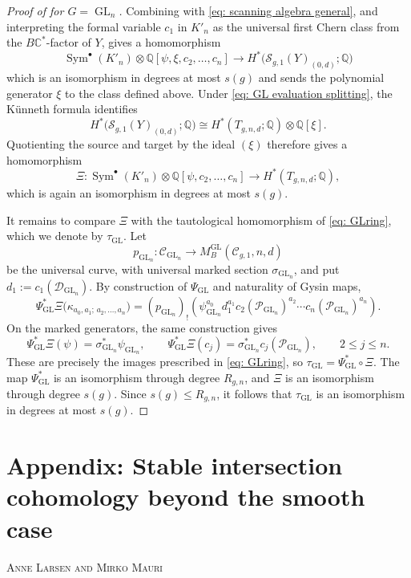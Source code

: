 \documentclass[11pt,reqno]{amsart}
\theoremstyle{plain} %
\theoremstyle{definition}
\newcommand{\QQ}{\mathbb{Q}}
\newcommand{\CC}{\mathbb{C}}
\newcommand{\C}{\mathcal{C}}
\DeclareMathOperator{\GL}{GL}
\DeclareMathOperator{\Sym}{Sym}
\newcommand{\Sc}{\mathcal{S}}
\begin{document}
\begin{proof}[Proof of  for $G=\GL_n$]
Combining  with \eqref{eq: scanning algebra general}, and interpreting the formal variable $c_1$ in $K'_n$ as the universal first Chern class from the $B\CC^*$-factor of $Y$, gives a homomorphism
\[
\Sym^\bullet(K'_n)\otimes\QQ[\psi,\xi,c_2,\dots,c_n]
\longrightarrow
H^*\big(\Sc_{g,1}(Y)_{(0,d)};\QQ\big)
\]
which is an isomorphism in degrees at most $s(g)$ and sends the polynomial generator $\xi$ to the class defined above. Under \eqref{eq: GL evaluation splitting}, the K\"unneth formula identifies
\[
H^*\big(\Sc_{g,1}(Y)_{(0,d)};\QQ\big)
\cong H^*(T_{g,n,d};\QQ)\otimes\QQ[\xi].
\]
Quotienting the source and target by the ideal $(\xi)$ therefore gives a homomorphism
\begin{equation}\label{eq: GL target algebra}
\Xi\colon
\Sym^\bullet(K'_n)\otimes\QQ[\psi,c_2,\dots,c_n]
\longrightarrow H^*(T_{g,n,d};\QQ),
\end{equation}
which is again an isomorphism in degrees at most $s(g)$.

It remains to compare $\Xi$ with the tautological homomorphism of \eqref{eq: GLring}, which we denote by $\tau_{\GL}$. Let
\[
p_{\GL_n}\colon\mathcal C_{\GL_n}\longrightarrow M_B^{\GL}(\C_{g,1},n,d)
\]
be the universal curve, with universal marked section $\sigma_{\GL_n}$, and put $d_1:=c_1(\mathcal D_{\GL_n})$. By construction of $\Psi_{\GL}$ and naturality of Gysin maps,
\[
\Psi_{\GL}^*\Xi\big(\kappa_{a_0,a_1;\,a_2,\dots,a_n}\big)=(p_{\GL_n})_!\left(\psi_{\GL_n}^{a_0}d_1^{a_1}c_2(\mathcal P_{\GL_n})^{a_2}\cdots c_n(\mathcal P_{\GL_n})^{a_n}\right).
\]
On the marked generators, the same construction gives
\[
\Psi_{\GL}^*\Xi(\psi)=\sigma_{\GL_n}^*\psi_{\GL_n},
\qquad
\Psi_{\GL}^*\Xi(c_j)=\sigma_{\GL_n}^*c_j(\mathcal P_{\GL_n}),\qquad 2\leq j\leq n.
\]
These are precisely the images prescribed in \eqref{eq: GLring}, so $\tau_{\GL}=\Psi_{\GL}^*\circ\Xi$. The map $\Psi_{\GL}^*$ is an isomorphism through degree $R_{g,n}$, and $\Xi$ is an isomorphism through degree $s(g)$. Since $s(g)\leq R_{g,n}$, it follows that $\tau_{\GL}$ is an isomorphism in degrees at most $s(g)$.
\end{proof}

\appendix

\section*{Appendix: Stable intersection cohomology beyond the smooth case} 
\setcounter{section}{1}
\setcounter{theorem}{0}
\begin{center}
\textsc{Anne Larsen and Mirko Mauri}
\end{center}
\end{document}

